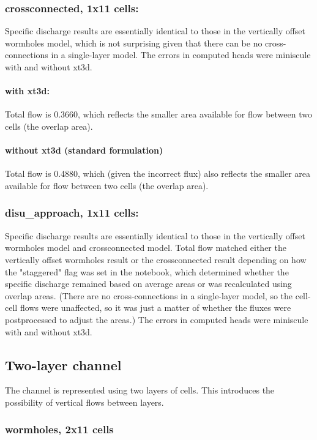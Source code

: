 \documentclass{article}
\begin{document}
\subsubsection{crossconnected, 1x11 cells:} Specific discharge results are essentially identical to those in the vertically offset wormholes model, which is not surprising given that there can be no cross-connections in a single-layer model. The errors in computed heads were miniscule with and without xt3d.

\paragraph{with xt3d:} Total flow is 0.3660, which reflects the smaller area available for flow between two cells (the overlap area).

\paragraph{without xt3d (standard formulation)} Total flow is 0.4880, which (given the incorrect flux) also reflects the smaller area available for flow between two cells (the overlap area).

\subsubsection{disu\_approach, 1x11 cells:} Specific discharge results are essentially identical to those in the vertically offset wormholes model and crossconnected model. Total flow matched either the vertically offset wormholes result or the crossconnected result depending on how the "staggered" flag was set in the notebook, which determined whether the specific discharge remained based on average areas or was recalculated using overlap areas. (There are no cross-connections in a single-layer model, so the cell-cell flows were unaffected, so it was just a matter of whether the fluxes were postprocessed to adjust the areas.) The errors in computed heads were miniscule with and without xt3d.

\subsection{Two-layer channel}
The channel is represented using two layers of cells. This introduces the possibility of vertical flows between layers.

\subsubsection{wormholes, 2x11 cells}
\end{document}
